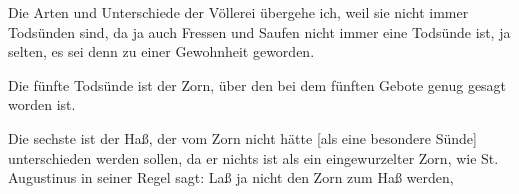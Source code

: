 Die Arten und Unterschiede der Völlerei übergehe ich, weil sie nicht immer Todsünden sind, da ja auch Fressen und Saufen nicht immer eine Todsünde ist, ja selten, es sei denn zu einer Gewohnheit geworden.

Die fünfte Todsünde ist der Zorn, über den bei dem fünften Gebote genug gesagt worden ist.

Die sechste ist der Haß, der vom Zorn nicht hätte [als eine besondere Sünde] unterschieden werden sollen, da er nichts ist als ein eingewurzelter Zorn, wie St. Augustinus in seiner Regel sagt: Laß ja nicht den Zorn zum Haß werden,
